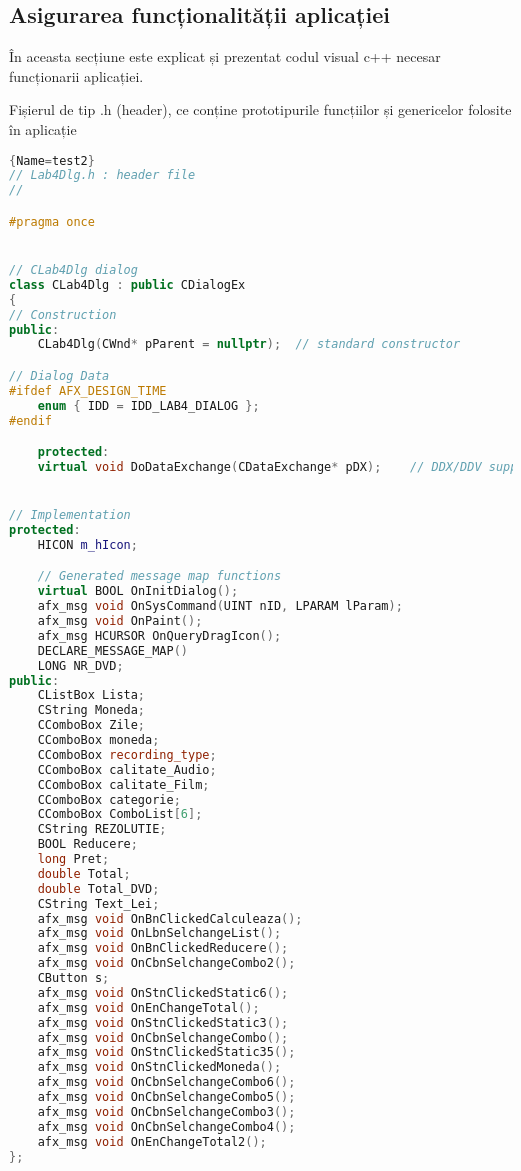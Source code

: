 \documentclass{amsart}
\begin{document}
\newpage %



\subsection{Asigurarea funcționalității aplicației}
\hfill \newline

În aceasta secțiune este explicat și prezentat codul visual c++ necesar funcționarii aplicației. 
\hfill \newline

Fișierul de tip .h (header), ce conține prototipurile funcțiilor și genericelor folosite în aplicație 
\hfill \newline


\begin{lstlisting}[language=C++]{Name=test2}
// Lab4Dlg.h : header file
//

#pragma once


// CLab4Dlg dialog
class CLab4Dlg : public CDialogEx
{
// Construction
public:
	CLab4Dlg(CWnd* pParent = nullptr);	// standard constructor

// Dialog Data
#ifdef AFX_DESIGN_TIME
	enum { IDD = IDD_LAB4_DIALOG };
#endif

	protected:
	virtual void DoDataExchange(CDataExchange* pDX);	// DDX/DDV support


// Implementation
protected:
	HICON m_hIcon;

	// Generated message map functions
	virtual BOOL OnInitDialog();
	afx_msg void OnSysCommand(UINT nID, LPARAM lParam);
	afx_msg void OnPaint();
	afx_msg HCURSOR OnQueryDragIcon();
	DECLARE_MESSAGE_MAP()
	LONG NR_DVD;
public:
	CListBox Lista;
	CString Moneda;
	CComboBox Zile;
	CComboBox moneda;
	CComboBox recording_type;
	CComboBox calitate_Audio;
	CComboBox calitate_Film;
	CComboBox categorie;
	CComboBox ComboList[6];
	CString REZOLUTIE;
	BOOL Reducere;
	long Pret;
	double Total;
	double Total_DVD;
	CString Text_Lei;
	afx_msg void OnBnClickedCalculeaza();
	afx_msg void OnLbnSelchangeList();
	afx_msg void OnBnClickedReducere();
	afx_msg void OnCbnSelchangeCombo2();
	CButton s;
	afx_msg void OnStnClickedStatic6();
	afx_msg void OnEnChangeTotal();
	afx_msg void OnStnClickedStatic3();
	afx_msg void OnCbnSelchangeCombo();
	afx_msg void OnStnClickedStatic35();
	afx_msg void OnStnClickedMoneda();
	afx_msg void OnCbnSelchangeCombo6();
	afx_msg void OnCbnSelchangeCombo5();
	afx_msg void OnCbnSelchangeCombo3();
	afx_msg void OnCbnSelchangeCombo4();
	afx_msg void OnEnChangeTotal2();
};



\end{lstlisting}
\end{document}
